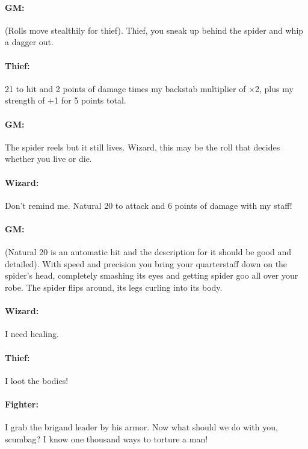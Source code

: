 \begin{multicols}{2}
\paragraph{GM:}  (Rolls move stealthily for thief).  Thief, you sneak up behind the spider and whip a dagger out.

\paragraph{Thief:}  21 to hit and 2 points of damage times my backstab multiplier of $\times$2, plus my strength of +1 for 5 points total.

\paragraph{GM:} The spider reels but it still lives.  Wizard, this may be the roll that decides whether you live or die.

\paragraph{Wizard:}  Don't remind me.  Natural 20 to attack and 6 points of damage with my staff!

\paragraph{GM:} (Natural 20 is an automatic hit and the description for it should be good and detailed).  With speed and precision you bring your quarterstaff down on the spider's head, completely smashing its eyes and getting spider goo all over your robe.  The spider flips around, its legs curling into its body.

\paragraph{Wizard:}  I need healing.

\paragraph{Thief:}  I loot the bodies!

\paragraph{Fighter:}  I grab the brigand leader by his armor.  Now what should we do with you, scumbag?  I know one thousand ways to torture a man!


\end{multicols}
